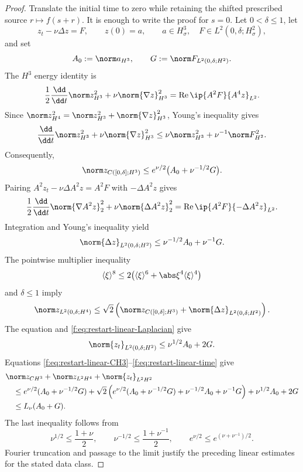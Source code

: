\begin{proof}
Translate the initial time to zero while retaining the shifted prescribed
source \(r\mapsto f(s+r)\).  It is enough to write the proof for
\(s=0\).
Let \(0<\delta\le1\), let
\[
 z_t-\nu\Delta z=F,
 \qquad z(0)=a,
 \qquad
 a\in H^3_\sigma,\quad
 F\in L^2(0,\delta;H^2_\sigma),
\]
and set
\[
 A_0:=\norm a_{H^3},
 \qquad
 G:=\norm F_{L^2(0,\delta;H^2)}.
\]
The \(H^3\) energy identity is
\[
 \frac12\frac{\dd}{\dd t}\norm z_{H^3}^2
 +\nu\norm{\nabla z}_{H^3}^2
 =\operatorname{Re}\ip{A^2F}{A^4z}_{L^2}.
\]
Since
\(\norm z_{H^4}^2=\norm z_{H^3}^2+\norm{\nabla z}_{H^3}^2\),
Young's inequality gives
\[
 \frac{\dd}{\dd t}\norm z_{H^3}^2
 +\nu\norm{\nabla z}_{H^3}^2
 \le \nu\norm z_{H^3}^2+\nu^{-1}\norm F_{H^2}^2.
\]
Consequently,
\begin{equation}
 \norm z_{C([0,\delta];H^3)}
 \le e^{\nu/2}\bigl(A_0+\nu^{-1/2}G\bigr).
 \label{f:eq:restart-linear-CH3}
\end{equation}
Pairing \(A^2z_t-\nu\Delta A^2z=A^2F\) with
\(-\Delta A^2z\) gives
\[
 \frac12\frac{\dd}{\dd t}\norm{\nabla A^2z}_2^2
 +\nu\norm{\Delta A^2z}_2^2
 =\operatorname{Re}\ip{A^2F}{-\Delta A^2z}_{L^2}.
\]
Integration and Young's inequality yield
\begin{equation}
 \norm{\Delta z}_{L^2(0,\delta;H^2)}
 \le \nu^{-1/2}A_0+\nu^{-1}G.
 \label{f:eq:restart-linear-Laplacian}
\end{equation}
The pointwise multiplier inequality
\[
 \langle\xi\rangle^8
 \le2\bigl(\langle\xi\rangle^6
       +\abs\xi^4\langle\xi\rangle^4\bigr)
\]
and \(\delta\le1\) imply
\begin{equation}
 \norm z_{L^2(0,\delta;H^4)}
 \le\sqrt2\left(
 \norm z_{C([0,\delta];H^3)}
 +\norm{\Delta z}_{L^2(0,\delta;H^2)}
 \right).
 \label{f:eq:restart-linear-H4}
\end{equation}
The equation and \eqref{f:eq:restart-linear-Laplacian} give
\begin{equation}
 \norm{z_t}_{L^2(0,\delta;H^2)}
 \le\nu^{1/2}A_0+2G.
 \label{f:eq:restart-linear-time}
\end{equation}
Equations \eqref{f:eq:restart-linear-CH3}--\eqref{f:eq:restart-linear-time}
give
\begin{align*}
 &\norm z_{C H^3}+\norm z_{L^2H^4}+\norm{z_t}_{L^2H^2}\\
 &\quad\le
 e^{\nu/2}(A_0+\nu^{-1/2}G)
 +\sqrt2\left(
 e^{\nu/2}(A_0+\nu^{-1/2}G)
 +\nu^{-1/2}A_0+\nu^{-1}G\right)
 +\nu^{1/2}A_0+2G\\
 &\quad\le L_\nu(A_0+G).
\end{align*}
The last inequality follows from
\[
 \nu^{1/2}\le\frac{1+\nu}{2},
 \qquad
 \nu^{-1/2}\le\frac{1+\nu^{-1}}2,
 \qquad
 e^{\nu/2}\le e^{(\nu+\nu^{-1})/2}.
\]
Fourier truncation and passage to the limit justify the preceding linear
estimates for the stated data class.


\end{proof}
